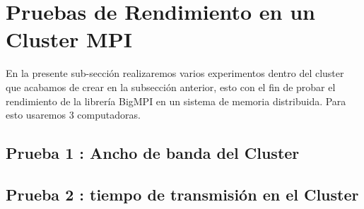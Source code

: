 \documentclass[conference]{IEEEtran}
\begin{document}
\section{Pruebas de Rendimiento en un Cluster MPI}
En la presente sub-sección realizaremos varios experimentos dentro del cluster
que acabamos de crear en la subsección anterior, esto con el fin de
probar el rendimiento de la librería BigMPI en un sistema de memoria distribuida.
Para esto usaremos 3 computadoras.

\subsection{Prueba 1 : Ancho de banda del Cluster}
\begin{table}[htb]
\caption{Transmisión de datos en cluster - Resultados (B/s)}
\label{1234}
\end{table}
\subsection{Prueba 2 : tiempo de transmisión en el Cluster}
\begin{table}[htb]
\caption{Transmisión de datos 2GB (s)}
\label{1234}
\end{table}
\end{document}
